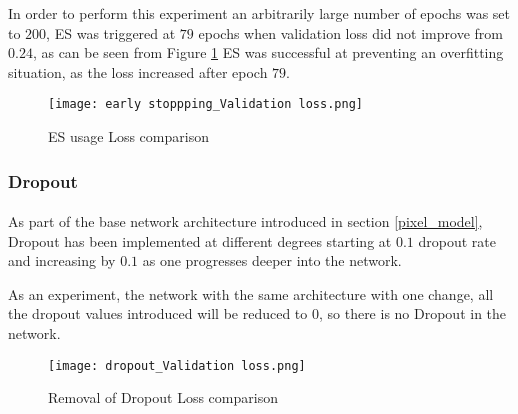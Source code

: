 In order to perform this experiment an arbitrarily large number of epochs was set to $200$, \gls{ES} was triggered at $79$ epochs when validation loss did not improve from $0.24$, as can be seen from Figure \ref{es_loss} \gls{ES} was successful at preventing an overfitting situation, as the loss increased after epoch $79$.

\begin{figure}[hbt!]
    \centering
    \texttt{[image: early stoppping\_Validation loss.png]}
    \caption{\gls{ES} usage Loss comparison}
    \label{es_loss}
\end{figure}

\subsubsection{Dropout}
\paragraph{}
As part of the base network architecture introduced in section \ref{pixel_model}, Dropout has been implemented at different degrees starting at $0.1$ dropout rate and increasing by $0.1$ as one progresses deeper into the network.

As an experiment, the network with the same architecture with one change, all the dropout values introduced will be reduced to $0$, so there is no Dropout in the network.

\begin{figure}[hbt!]
    \centering
    \texttt{[image: dropout\_Validation loss.png]}
    \caption{Removal of Dropout Loss comparison}
    \label{dropout_loss}
\end{figure}

